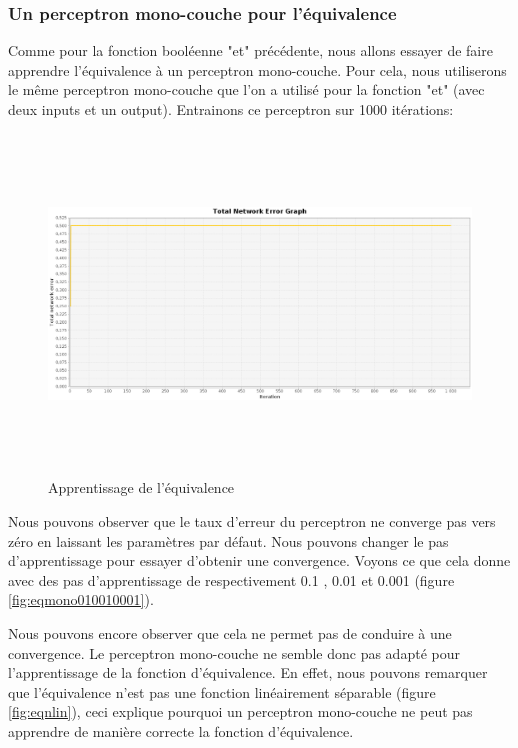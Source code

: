 \documentclass[twoside,openright,a4paper,11pt,french]{article}
\begin{document}
\subsubsection{Un perceptron mono-couche pour l'équivalence}

Comme pour la fonction booléenne "et" précédente, nous allons essayer de faire
apprendre l'équivalence à un perceptron mono-couche. Pour cela, nous utiliserons le même
perceptron mono-couche que l'on a utilisé pour la fonction "et" (avec deux inputs
et un output). Entrainons ce perceptron sur 1000 itérations:

\begin{figure}[ht]
\centering
\includegraphics[width=12cm,height=9cm]{./pics/eq/mono_eq_def.eps}
\caption{Apprentissage de l'équivalence}
\end{figure}

Nous pouvons observer que le taux d'erreur du perceptron ne converge pas vers
zéro en laissant les paramètres par défaut. Nous pouvons changer le pas
d'apprentissage pour essayer d'obtenir une convergence.
Voyons ce que cela donne avec des pas d'apprentissage de respectivement 0.1 ,
0.01 et 0.001 (figure \ref{fig:eqmono010010001}).

Nous pouvons encore observer que cela ne permet pas de conduire à une convergence.
Le perceptron mono-couche ne semble donc pas adapté pour l'apprentissage de la fonction
d'équivalence. En effet, nous pouvons remarquer que l'équivalence n'est pas une fonction
linéairement séparable (figure \ref{fig:eqnlin}), ceci explique pourquoi un
perceptron mono-couche ne peut pas apprendre de manière correcte la fonction
d'équivalence.
\end{document}
